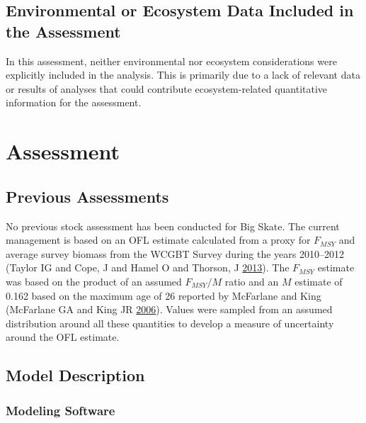 \documentclass[12pt,]{article}
\begin{document}
\vspace{.5cm}

\hypertarget{environmental-or-ecosystem-data-included-in-the-assessment}{%
\subsection{Environmental or Ecosystem Data Included in the
Assessment}\label{environmental-or-ecosystem-data-included-in-the-assessment}}

In this assessment, neither environmental nor ecosystem considerations
were explicitly included in the analysis. This is primarily due to a
lack of relevant data or results of analyses that could contribute
ecosystem-related quantitative information for the assessment.

\newpage

\hypertarget{assessment}{%
\section{Assessment}\label{assessment}}

\hypertarget{previous-assessments}{%
\subsection{Previous Assessments}\label{previous-assessments}}

No previous stock assessment has been conducted for Big Skate. The
current management is based on an OFL estimate calculated from a proxy
for \(F_{MSY}\) and average survey biomass from the WCGBT Survey during
the years 2010--2012 (Taylor IG and Cope, J and Hamel O and Thorson, J
\protect\hyperlink{ref-Taylor2013}{2013}). The \(F_{MSY}\) estimate was
based on the product of an assumed \(F_{MSY}/M\) ratio and an \(M\)
estimate of 0.162 based on the maximum age of 26 reported by McFarlane
and King (McFarlane GA and King JR
\protect\hyperlink{ref-McFandKing2006}{2006}). Values were sampled from
an assumed distribution around all these quantities to develop a measure
of uncertainty around the OFL estimate.

\hypertarget{model-description}{%
\subsection{Model Description}\label{model-description}}

\hypertarget{modeling-software}{%
\subsubsection{Modeling Software}\label{modeling-software}}
\end{document}
